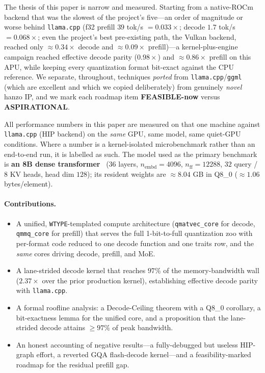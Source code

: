 \documentclass[11pt]{article}
\begin{document}
The thesis of this paper is narrow and measured. Starting from a native-ROCm backend that was the slowest of the project's five---an order of magnitude or worse behind \texttt{llama.cpp} (f32 prefill $39$ tok/s $=0.033\times$; decode $1.7$ tok/s $=0.068\times$; even the project's best pre-existing path, the Vulkan backend, reached only $\approx 0.34\times$ decode and $\approx 0.09\times$ prefill)---a kernel-plus-engine campaign reached effective decode parity ($0.98\times$) and $\approx 0.86\times$ prefill on this APU, while keeping every quantization format bit-exact against the CPU reference. We separate, throughout, techniques \emph{ported} from \texttt{llama.cpp}/\texttt{ggml}~\cite{ggml,llamacpp} (which are excellent and which we copied deliberately) from genuinely \emph{novel} hanzo IP, and we mark each roadmap item \textbf{FEASIBLE-now} versus \textbf{ASPIRATIONAL}.

All performance numbers in this paper are measured on that one machine against \texttt{llama.cpp} (HIP backend) on the \emph{same} GPU, same model, same quiet-GPU conditions. Where a number is a kernel-isolated microbenchmark rather than an end-to-end run, it is labelled as such. The model used as the primary benchmark is \textbf{an 8B dense transformer}~\cite{qwen3} ($36$ layers, $n_{\text{embd}}=4096$, $n_{\text{ff}}=12288$, $32$ query / $8$ KV heads, head dim $128$); its resident weights are $\approx 8.04$ GB in Q8\_0 ($\approx 1.06$ bytes/element).

\paragraph{Contributions.}
\begin{itemize}
    \item A unified, \texttt{WTYPE}-templated compute architecture (\texttt{qmatvec\_core} for decode, \texttt{qmmq\_core} for prefill) that serves the full 1-bit-to-full quantization zoo with per-format code reduced to one decode function and one traits row, and the \emph{same} cores driving decode, prefill, and MoE.
    \item A lane-strided decode kernel that reaches $97\%$ of the memory-bandwidth wall ($2.37\times$ over the prior production kernel), establishing effective decode parity with \texttt{llama.cpp}.
    \item A formal roofline analysis: a Decode-Ceiling theorem with a Q8\_0 corollary, a bit-exactness lemma for the unified core, and a proposition that the lane-strided decode attains $\geq 97\%$ of peak bandwidth.
    \item An honest accounting of negative results---a fully-debugged but useless HIP-graph effort, a reverted GQA flash-decode kernel---and a feasibility-marked roadmap for the residual prefill gap.
\end{itemize}
\end{document}
